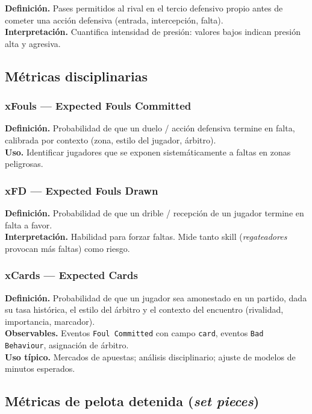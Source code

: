 \textbf{Definición.} Pases permitidos al rival en el tercio defensivo propio antes de cometer una acción defensiva (entrada, intercepción, falta).\\
\textbf{Interpretación.} Cuantifica intensidad de presión: valores bajos indican presión alta y agresiva.

\subsection{Métricas disciplinarias}

\subsubsection{xFouls --- Expected Fouls Committed}

\textbf{Definición.} Probabilidad de que un duelo / acción defensiva termine en falta, calibrada por contexto (zona, estilo del jugador, árbitro).\\
\textbf{Uso.} Identificar jugadores que se exponen sistemáticamente a faltas en zonas peligrosas.

\subsubsection{xFD --- Expected Fouls Drawn}

\textbf{Definición.} Probabilidad de que un drible / recepción de un jugador termine en falta a favor.\\
\textbf{Interpretación.} Habilidad para forzar faltas. Mide tanto skill (\emph{regateadores} provocan más faltas) como riesgo.

\subsubsection{xCards --- Expected Cards}

\textbf{Definición.} Probabilidad de que un jugador sea amonestado en un partido, dada su tasa histórica, el estilo del árbitro y el contexto del encuentro (rivalidad, importancia, marcador).\\
\textbf{Observables.} Eventos \texttt{Foul Committed} con campo \texttt{card}, eventos \texttt{Bad Behaviour}, asignación de árbitro.\\
\textbf{Uso típico.} Mercados de apuestas; análisis disciplinario; ajuste de modelos de minutos esperados.

\subsection{Métricas de pelota detenida (\emph{set pieces})}

